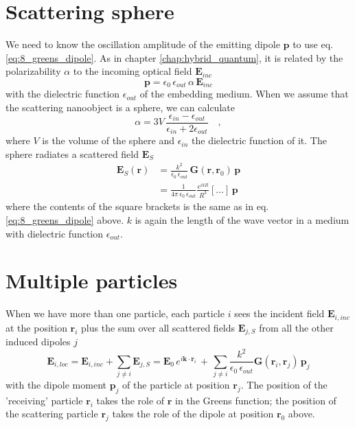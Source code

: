 \section{Scattering sphere}

We need to know the oscillation amplitude of the emitting dipole $\mathbf{p}$ to use eq. \ref{eq:8_greens_dipole}. As in chapter \ref{chap:hybrid_quantum}, it is related by the  polarizability $\alpha$  to the incoming optical field $\mathbf{E}_{inc}$
\begin{equation}
\mathbf{p} = \epsilon_0 \, \epsilon_{out} \, \alpha \, \mathbf{E}_{inc}
\end{equation}
with the dielectric function $\epsilon_{out}$ of the embedding medium. 
When we assume that the scattering nanoobject is a sphere, we can calculate
\begin{equation}
 \alpha = 3V \, \frac{\epsilon_{in} - \epsilon_{out}}{\epsilon_{in} + 2 \epsilon_{out}} \quad ,
\end{equation}
where $V$ is the volume of the sphere and  $\epsilon_{in}$ the dielectric function of it. 
The sphere  radiates a scattered field $\mathbf{E}_S$
\begin{align}
\mathbf{E}_S(\mathbf{r}) & =  \frac{k^2}{\epsilon_0 \, \epsilon_{out}} \, \mathbf{G}(\mathbf{r}, \mathbf{r}_0) \,  \mathbf{p} \\
 & =  \frac{1}{4 \pi \, \epsilon_0 \, \epsilon_{out}  }  \frac{e^{i k R} }{  R^3 } 
\left[  \dots \right] \, \mathbf{p}
\end{align}
where the contents of the square brackets is the same as in eq.\ref{eq:8_greens_dipole} above. $k$ is again the length of the wave vector in a medium with dielectric function $\epsilon_{out}$.

\section{Multiple particles}

When we have more than one particle, each particle $i$ sees the incident field $\mathbf{E}_{i, inc}$ at the   position $\mathbf{r}_i$ plus the sum over all scattered fields $\mathbf{E}_{j, S}$ from all the other induced dipoles $j$
\begin{equation}
\mathbf{E}_{i, loc} = \mathbf{E}_{i, inc} + \sum_{j \neq i} \mathbf{E}_{j, S}
 = \mathbf{E}_{0} \, e^{i \mathbf{k} \cdot \mathbf{r}_i} \, +  \, 
 \sum_{j \neq i} \frac{k^2}{\epsilon_0 \, \epsilon_{out}} 
 \mathbf{G}(\mathbf{r}_i, \mathbf{r}_j) \,  \mathbf{p}_j  \label{eq:8_elocal}
\end{equation}
with the dipole moment $ \mathbf{p}_j$ of the particle at position $\mathbf{r}_j$. The position of the 'receiving' particle $\mathbf{r}_i$ takes the role of $\mathbf{r}$ in the Greens function; the position of the scattering particle $\mathbf{r}_j$ takes the role of the dipole at position $\mathbf{r}_0$ above.

